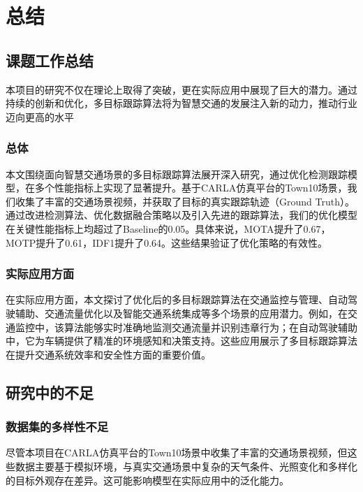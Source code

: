 \chapter{总结}




\section{课题工作总结}

本项目的研究不仅在理论上取得了突破，更在实际应用中展现了巨大的潜力。通过持续的创新和优化，多目标跟踪算法将为智慧交通的发展注入新的动力，推动行业迈向更高的水平

\subsection{总体}
本文围绕面向智慧交通场景的多目标跟踪算法展开深入研究，通过优化检测跟踪模型，在多个性能指标上实现了显著提升。基于CARLA仿真平台的Town10场景，我们收集了丰富的交通场景视频，并获取了目标的真实跟踪轨迹（Ground Truth）。通过改进检测算法、优化数据融合策略以及引入先进的跟踪算法，我们的优化模型在关键性能指标上均超过了Baseline的0.05。具体来说，MOTA提升了0.67，MOTP提升了0.61，IDF1提升了0.64。这些结果验证了优化策略的有效性。

\subsection{实际应用方面}
在实际应用方面，本文探讨了优化后的多目标跟踪算法在交通监控与管理、自动驾驶辅助、交通流量优化以及智能交通系统集成等多个场景的应用潜力。例如，在交通监控中，该算法能够实时准确地监测交通流量并识别违章行为；在自动驾驶辅助中，它为车辆提供了精准的环境感知和决策支持。这些应用展示了多目标跟踪算法在提升交通系统效率和安全性方面的重要价值\cite{一种基于carla的预制轨迹仿真场景的搭建方法}。



\section{研究中的不足}


\subsection{数据集的多样性不足}

尽管本项目在CARLA仿真平台的Town10场景中收集了丰富的交通场景视频，但这些数据主要基于模拟环境，与真实交通场景中复杂的天气条件、光照变化和多样化的目标外观存在差异。这可能影响模型在实际应用中的泛化能力\cite{梁艳辉 2024 基于YOLOv7网络的CARLA驾驶模拟器目标检测系统实现}。


